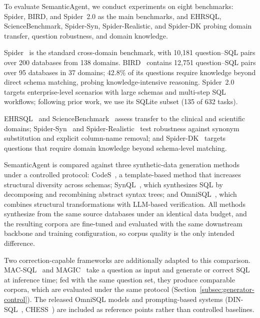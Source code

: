 \documentclass[letterpaper,journal]{IEEEtran}
\begin{document}
To evaluate SemanticAgent, we conduct experiments on eight benchmarks: Spider, BIRD, and Spider~2.0 as the main benchmarks, and EHRSQL, ScienceBenchmark, Spider-Syn, Spider-Realistic, and Spider-DK probing domain transfer, question robustness, and domain knowledge.

Spider~\cite{yu2018spider} is the standard cross-domain benchmark, with 10,181 question--SQL pairs over 200 databases from 138 domains. BIRD~\cite{li2023can} contains 12,751 question--SQL pairs over 95 databases in 37 domains; 42.8\% of its questions require knowledge beyond direct schema matching, probing knowledge-intensive reasoning. Spider~2.0~\cite{lei2024spider2} targets enterprise-level scenarios with large schemas and multi-step SQL workflows; following prior work, we use its SQLite subset (135 of 632 tasks).

EHRSQL~\cite{lee2022ehrsql} and ScienceBenchmark~\cite{zhang2023sciencebenchmark} assess transfer to the clinical and scientific domains; Spider-Syn~\cite{gan2021syn} and Spider-Realistic~\cite{deng2021structure} test robustness against synonym substitution and explicit column-name removal; and Spider-DK~\cite{gan2021exploring} targets questions that require domain knowledge beyond schema-level matching.

SemanticAgent is compared against three synthetic-data generation methods under a controlled protocol: CodeS~\cite{li2024codes}, a template-based method that increases structural diversity across schemas; SynQL~\cite{baumgartner2024synql}, which synthesizes SQL by decomposing and recombining abstract syntax trees; and OmniSQL~\cite{li2025omnisql}, which combines structural transformations with LLM-based verification. All methods synthesize from the same source databases under an identical data budget, and the resulting corpora are fine-tuned and evaluated with the same downstream backbone and training configuration, so corpus quality is the only intended difference.

Two correction-capable frameworks are additionally adapted to this comparison. MAC-SQL~\cite{wang2025macsql} and MAGIC~\cite{askari2025magic} take a question as input and generate or correct SQL at inference time; fed with the same question set, they produce comparable corpora, which are evaluated under the same protocol (Section~\ref{subsec:generator-control}). The released OmniSQL models and prompting-based systems (DIN-SQL~\cite{pourreza2023din}, CHESS~\cite{talaei2024chess}) are included as reference points rather than controlled baselines.
\end{document}
